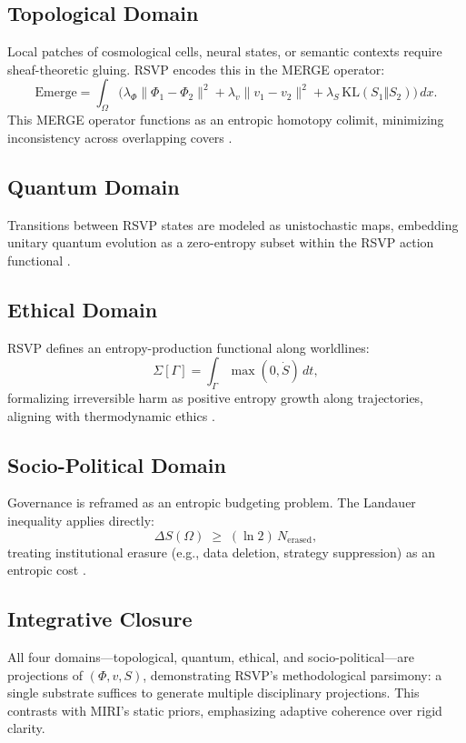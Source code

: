 \documentclass[12pt]{article}
\begin{document}
\subsection{Topological Domain}
Local patches of cosmological cells, neural states, or semantic contexts require sheaf-theoretic gluing. RSVP encodes this in the MERGE operator:
\[
\mathrm{Emerge} = \int_\Omega \Big(\lambda_\Phi\|\Phi_1-\Phi_2\|^2 + \lambda_v\|v_1-v_2\|^2 + \lambda_S\,\mathrm{KL}(S_1\Vert S_2)\Big)\,dx.
\]
This MERGE operator functions as an entropic homotopy colimit, minimizing inconsistency across overlapping covers \citep{lurie2009higher}.

\subsection{Quantum Domain}
Transitions between RSVP states are modeled as unistochastic maps, embedding unitary quantum evolution as a zero-entropy subset within the RSVP action functional \citep{barandes2022unistochastic}.

\subsection{Ethical Domain}
RSVP defines an entropy-production functional along worldlines:
\[
\Sigma[\Gamma] = \int_\Gamma \max(0,\dot S)\,dt,
\]
formalizing irreversible harm as positive entropy growth along trajectories, aligning with thermodynamic ethics \citep{verlinde2011entropic}.

\subsection{Socio-Political Domain}
Governance is reframed as an entropic budgeting problem. The Landauer inequality applies directly:
\[
\Delta S(\Omega) \;\geq\; (\ln 2)\,N_{\mathrm{erased}},
\]
treating institutional erasure (e.g., data deletion, strategy suppression) as an entropic cost \citep{landauer1961irreversibility}.

\subsection{Integrative Closure}
All four domains—topological, quantum, ethical, and socio-political—are projections of $(\Phi,v,S)$, demonstrating RSVP’s methodological parsimony: a single substrate suffices to generate multiple disciplinary projections. This contrasts with MIRI’s static priors, emphasizing adaptive coherence over rigid clarity.
\end{document}
